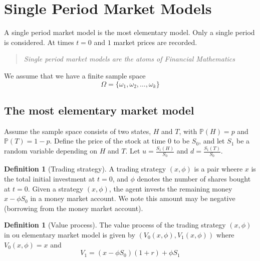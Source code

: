 \documentclass[10pt, oneside, reqno]{amsart}
\theoremstyle{plain}%
\theoremstyle{definition}
\newtheorem{defn}[thm]{Definition}
\theoremstyle{remark}
\newcommand{\prob}[1]{\mathbb{P}(#1)}
\begin{document}


\newcommand{\tst}{(x,\phi)}

\section{Single Period Market Models} %
\label{sec:single_period_market_models}

A single period market model is the most elementary model.  Only a single period is considered.  At times $t=0$ and $1$ market prices are recorded.

\begin{quote}
\emph{  Single period market models are the atoms of Financial Mathematics
}\end{quote}

We assume that we have a finite sample space \[
    \Omega = \{ \omega_1, \omega_2, \dots, \omega_k \}
\]

\subsection{The most elementary market model} %
\label{sub:the_most_elementary_market_model}

Assume the sample space consists of two states, $H$ and $T$, with $\prob{H} = p$ and $ \prob{T} = 1-p$.  Define the price of the stock at time $0$ to be $S_0$, and let $S_1$ be a random variable depending on $H$ and $T$.  Let $u = \frac{S_1(H)}{S_0}$ and $d = \frac{S_1(T)}{S_0}$.  


\begin{defn}[Trading strategy]
    A trading strategy $(x,\phi)$ is a pair wheere $x$ is the total initial investment at $t=0$, and $\phi$ denotes the number of shares bought at $t = 0$.  Given a strategy $(x,\phi)$, the agent invests the remaining money $x - \phi S_0$ in a money market account.  We note this amount may be negative (borrowing from the money market account).
\end{defn}

\begin{defn}[Value process]
    The value process of the trading strategy $(x,\phi)$ in ou elementary market model is given by $(V_0(x,\phi), V_1(x,\phi))$ where $V_0(x,\phi) = x$ and \[
        V_1 = (x - \phi S_0)(1+r) +\phi S_1
    \]
\end{defn}
\end{document}
